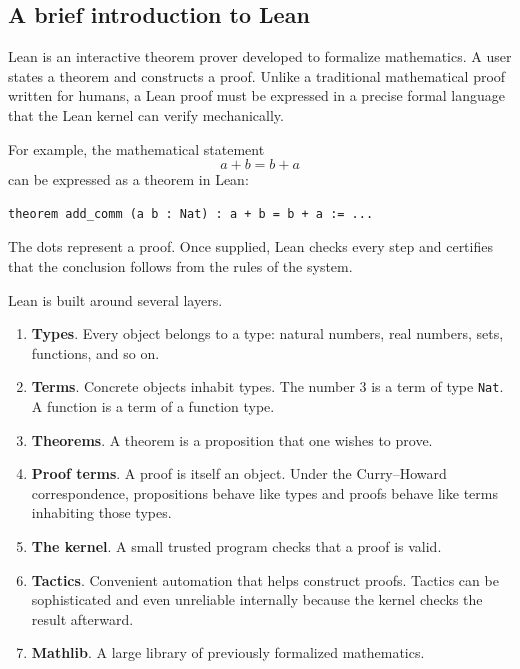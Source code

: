 \documentclass[11pt]{article}
\begin{document}
\subsection{A brief introduction to Lean}

Lean is an interactive theorem prover developed to formalize mathematics. A user
states a theorem and constructs a proof. Unlike a traditional mathematical proof
written for humans, a Lean proof must be expressed in a precise formal language that
the Lean kernel can verify mechanically.

For example, the mathematical statement
\[
a+b=b+a
\]
can be expressed as a theorem in Lean:

\begin{verbatim}
theorem add_comm (a b : Nat) : a + b = b + a := ...
\end{verbatim}

The dots represent a proof. Once supplied, Lean checks every step and certifies
that the conclusion follows from the rules of the system.

Lean is built around several layers.

\begin{enumerate}
\item \textbf{Types}. Every object belongs to a type: natural numbers, real
numbers, sets, functions, and so on.

\item \textbf{Terms}. Concrete objects inhabit types. The number $3$ is a term of
type \texttt{Nat}. A function is a term of a function type.

\item \textbf{Theorems}. A theorem is a proposition that one wishes to prove.

\item \textbf{Proof terms}. A proof is itself an object. Under the
Curry--Howard correspondence, propositions behave like types and proofs behave like
terms inhabiting those types.

\item \textbf{The kernel}. A small trusted program checks that a proof is valid.

\item \textbf{Tactics}. Convenient automation that helps construct proofs. Tactics
can be sophisticated and even unreliable internally because the kernel checks the
result afterward.

\item \textbf{Mathlib}. A large library of previously formalized mathematics.
\end{enumerate}
\end{document}
